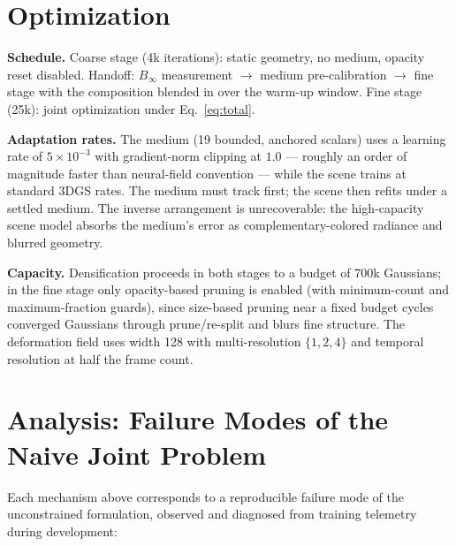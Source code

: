 \documentclass[11pt,a4paper]{article}
\newcommand{\Binf}{B_\infty}
\begin{document}
\section{Optimization}
\label{sec:opt}

\textbf{Schedule.} Coarse stage (4k iterations): static geometry, no medium, opacity reset disabled. Handoff: $\Binf$ measurement $\to$ medium pre-calibration $\to$ fine stage with the composition blended in over the warm-up window. Fine stage (25k): joint optimization under Eq.~\eqref{eq:total}.

\textbf{Adaptation rates.} The medium (19 bounded, anchored scalars) uses a learning rate of $5{\times}10^{-3}$ with gradient-norm clipping at $1.0$ --- roughly an order of magnitude faster than neural-field convention --- while the scene trains at standard 3DGS \cite{kerbl20233d} rates. The medium must track first; the scene then refits under a settled medium. The inverse arrangement is unrecoverable: the high-capacity scene model absorbs the medium's error as complementary-colored radiance and blurred geometry.

\textbf{Capacity.} Densification proceeds in both stages to a budget of 700k Gaussians; in the fine stage only opacity-based pruning is enabled (with minimum-count and maximum-fraction guards), since size-based pruning near a fixed budget cycles converged Gaussians through prune/re-split and blurs fine structure. The deformation field uses width 128 with multi-resolution $\{1,2,4\}$ and temporal resolution at half the frame count.

\section{Analysis: Failure Modes of the Naive Joint Problem}
\label{sec:analysis}

Each mechanism above corresponds to a reproducible failure mode of the unconstrained formulation, observed and diagnosed from training telemetry during development:
\end{document}

